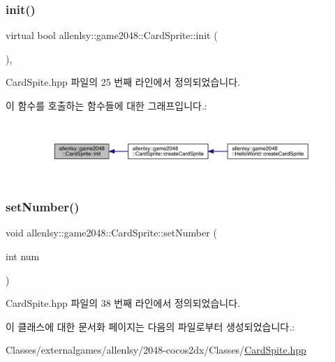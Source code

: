 \mbox{\label{classallenlsy_1_1game2048_1_1_card_sprite_ad6769d950c3b9b87092bd7e40d61dd4d}} 
\subsubsection{\texorpdfstring{init()}{init()}}
{\footnotesize\ttfamily virtual bool allenlsy\+::game2048\+::\+Card\+Sprite\+::init (\begin{DoxyParamCaption}{ }\end{DoxyParamCaption})\hspace{0.3cm}{\ttfamily [inline]}, {\ttfamily [virtual]}}



Card\+Spite.\+hpp 파일의 25 번째 라인에서 정의되었습니다.

이 함수를 호출하는 함수들에 대한 그래프입니다.\+:
\nopagebreak
\begin{figure}[H]
\begin{center}
\leavevmode
\includegraphics[width=350pt]{classallenlsy_1_1game2048_1_1_card_sprite_ad6769d950c3b9b87092bd7e40d61dd4d_icgraph}
\end{center}
\end{figure}
\mbox{\label{classallenlsy_1_1game2048_1_1_card_sprite_a7f560bb8253477188273aac709aae087}} 
\subsubsection{\texorpdfstring{set\+Number()}{setNumber()}}
{\footnotesize\ttfamily void allenlsy\+::game2048\+::\+Card\+Sprite\+::set\+Number (\begin{DoxyParamCaption}\item[{int}]{num }\end{DoxyParamCaption})\hspace{0.3cm}{\ttfamily [inline]}}



Card\+Spite.\+hpp 파일의 38 번째 라인에서 정의되었습니다.



이 클래스에 대한 문서화 페이지는 다음의 파일로부터 생성되었습니다.\+:\begin{DoxyCompactItemize}
\item 
Classes/externalgames/allenlsy/2048-\/cocos2dx/\+Classes/\hyperlink{_card_spite_8hpp}{Card\+Spite.\+hpp}\end{DoxyCompactItemize}

